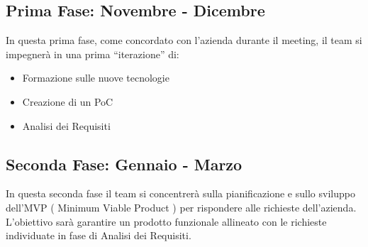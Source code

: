 \documentclass{TWDocumentFull}
\begin{document}
        \subsection*{Prima Fase: Novembre - Dicembre}
        {In questa prima fase, come concordato con l'azienda durante il meeting, il team si impegnerà in una prima “iterazione” di:}
            \begin{itemize}
                \item Formazione sulle nuove tecnologie
                \item Creazione di un PoC
                \item Analisi dei Requisiti
            \end{itemize}
        \subsection*{Seconda Fase: Gennaio - Marzo}
        {In questa seconda fase il team si concentrerà sulla pianificazione e sullo sviluppo dell'MVP ( Minimum Viable Product ) per rispondere alle richieste dell'azienda. L'obiettivo sarà garantire un prodotto funzionale allineato con le richieste individuate in fase di Analisi dei Requisiti.}
        
\end{document}
